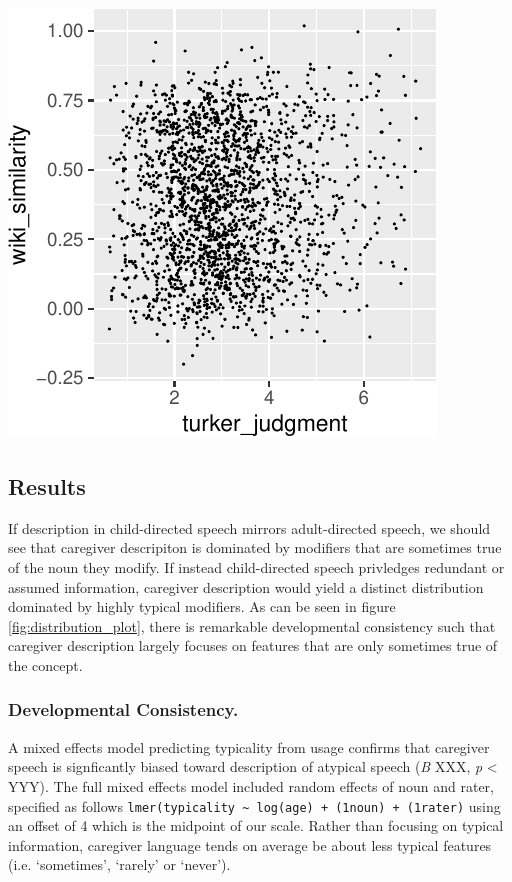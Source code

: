 \documentclass[10pt, letterpaper]{article}
\newenvironment{CodeChunk}{}{}
\begin{document}
\begin{CodeChunk}
\includegraphics{figs/models-3} \end{CodeChunk}

\hypertarget{results}{%
\subsection{Results}\label{results}}

If description in child-directed speech mirrors adult-directed speech,
we should see that caregiver descripiton is dominated by modifiers that
are sometimes true of the noun they modify. If instead child-directed
speech privledges redundant or assumed information, caregiver
description would yield a distinct distribution dominated by highly
typical modifiers. As can be seen in figure \ref{fig:distribution_plot},
there is remarkable developmental consistency such that caregiver
description largely focuses on features that are only sometimes true of
the concept.

\hypertarget{developmental-consistency.}{%
\subsubsection{Developmental
Consistency.}\label{developmental-consistency.}}

A mixed effects model predicting typicality from usage confirms that
caregiver speech is signficantly biased toward description of atypical
speech (\emph{B} XXX, \emph{p} \textless{} YYY). The full mixed effects
model included random effects of noun and rater, specified as follows
\texttt{lmer(typicality\ \textasciitilde{}\ log(age)\ +\ (1\textbar{}noun)\ +\ (1\textbar{}rater)}
using an offset of 4 which is the midpoint of our scale. Rather than
focusing on typical information, caregiver language tends on average be
about less typical features (i.e. `sometimes', `rarely' or `never').
\end{document}
